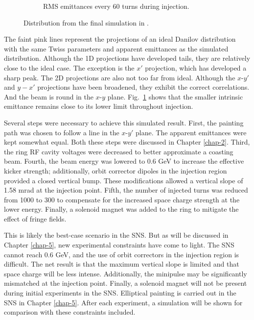 \begin{figure}[!p]
\begin{subfigure}{0.5\textwidth}
        \caption{RMS emittances every 60 turns during injection.}
        \label{fig:Holmes_emittances}
    \end{subfigure}
    \caption{Distribution from the final simulation in \cite{Holmes2018}.}
    \label{fig:Holmes}
\end{figure}
%
The faint pink lines represent the projections of an ideal Danilov distribution with the same Twiss parameters and apparent emittances as the simulated distribution. Although the 1D projections have developed tails, they are relatively close to the ideal case. The exception is the $x'$ projection, which has developed a sharp peak. The 2D projections are also not too far from ideal. Although the $x$-$y'$ and $y-x'$ projections have been broadened, they exhibit the correct correlations. And the beam is round in the $x$-$y$ plane. Fig.~\ref{fig:Holmes_emittances} shows that the smaller intrinsic emittance remains close to its lower limit throughout injection. 

Several steps were necessary to achieve this simulated result. First, the painting path was chosen to follow a line in the $x$-$y'$ plane. The apparent emittances were kept somewhat equal. Both these steps were discussed in Chapter \ref{chap-2}. Third, the ring RF cavity voltages were decreased to better approximate a coasting beam. Fourth, the beam energy was lowered to 0.6 GeV to increase the effective kicker strength; additionally, orbit corrector dipoles in the injection region provided a closed vertical bump. These modifications allowed a vertical slope of 1.58 mrad at the injection point. Fifth, the number of injected turns was reduced from 1000 to 300 to compensate for the increased space charge strength at the lower energy. Finally, a solenoid magnet was added to the ring to mitigate the effect of fringe fields. 

This is likely the best-case scenario in the SNS. But as will be discussed in Chapter \ref{chap-5}, new experimental constraints have come to light. The SNS cannot reach 0.6 GeV, and the use of orbit correctors in the injection region is difficult. The net result is that the maximum vertical slope is limited and that space charge will be less intense. Additionally, the minipulse may be significantly mismatched at the injection point. Finally, a solenoid magnet will not be present during initial experiments in the SNS. Elliptical painting is carried out in the SNS in Chapter \ref{chap-5}. After each experiment, a simulation will be shown for comparison with these constraints included. 



